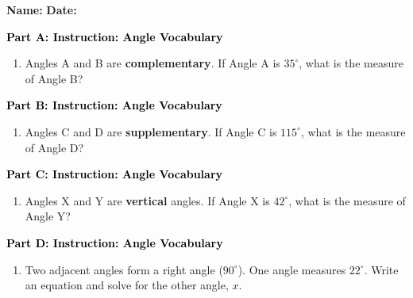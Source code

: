\documentclass[12pt, letterpaper, fleqn]{article}
\begin{document}
\textbf{Name:} \underline{\hspace{5cm}}
\hfill
\textbf{Date:} \underline{\hspace{3cm}}\\

\begin{tcolorbox}[colback=customteal!20]
\large\textcolor{black}{\textbf{Part A: Instruction: Angle Vocabulary}}
\end{tcolorbox}

\vspace{3mm}

\begin{enumerate}[itemsep=2.2cm, leftmargin=0.6cm]
\item Angles A and B are \textbf{complementary}. If Angle A is $35^\circ$, what is the measure of Angle B?
\end{enumerate}

\newpage

\begin{tcolorbox}[colback=customteal!20]
\large\textcolor{black}{\textbf{Part B: Instruction: Angle Vocabulary}}
\end{tcolorbox}

\vspace{3mm}

\begin{enumerate}[itemsep=2.2cm, leftmargin=0.6cm, resume]
\item Angles C and D are \textbf{supplementary}. If Angle C is $115^\circ$, what is the measure of Angle D?
\end{enumerate}

\newpage

\begin{tcolorbox}[colback=customteal!20]
\large\textcolor{black}{\textbf{Part C: Instruction: Angle Vocabulary}}
\end{tcolorbox}

\vspace{3mm}

\begin{enumerate}[itemsep=2.2cm, leftmargin=0.6cm, resume]
\item Angles X and Y are \textbf{vertical} angles. If Angle X is $42^\circ$, what is the measure of Angle Y?
\end{enumerate}

\newpage

\begin{tcolorbox}[colback=customteal!20]
\large\textcolor{black}{\textbf{Part D: Instruction: Angle Vocabulary}}
\end{tcolorbox}

\vspace{3mm}

\begin{enumerate}[itemsep=2.2cm, leftmargin=0.6cm, resume]
\item Two adjacent angles form a right angle ($90^\circ$). One angle measures $22^\circ$. Write an equation and solve for the other angle, $x$.
\end{enumerate}
\end{document}
